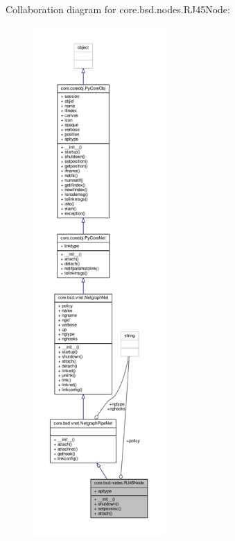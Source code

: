 Collaboration diagram for core.\+bsd.\+nodes.\+R\+J45\+Node\+:
\nopagebreak
\begin{figure}[H]
\begin{center}
\leavevmode
\includegraphics[height=550pt]{classcore_1_1bsd_1_1nodes_1_1_r_j45_node__coll__graph}
\end{center}
\end{figure}
